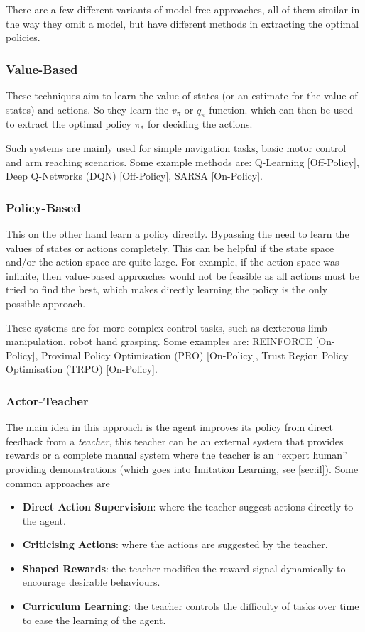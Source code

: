   There are a few different variants of model-free approaches, all of them similar in the way they omit a model, but have different methods in extracting the optimal policies.
  

  \subsubsection{Value-Based}
  These techniques aim to learn the value of states (or an estimate for the value of states) and actions. So they learn the $v_\pi$ or $q_\pi$ function. which can then be used to extract the optimal policy $\pi_*$ for deciding the actions.

  Such systems are mainly used for simple navigation tasks, basic motor control and arm reaching scenarios. Some example methods are: Q-Learning [Off-Policy], Deep Q-Networks (DQN) [Off-Policy], SARSA [On-Policy]. 

  \subsubsection{Policy-Based}
  This on the other hand learn a policy directly. Bypassing the need to learn the values of states or actions completely. This can be helpful if the state space and/or the action space are quite large. For example, if the action space was infinite, then value-based approaches would not be feasible as all actions must be tried to find the best, which makes directly learning the policy is the only possible approach.

  These systems are for more complex control tasks, such as dexterous limb manipulation, robot hand grasping. Some examples are: REINFORCE [On-Policy], Proximal Policy Optimisation (PRO) [On-Policy], Trust Region Policy Optimisation (TRPO) [On-Policy]. 

  \subsubsection{Actor-Teacher} 
  The main idea in this approach is the agent improves its policy from direct feedback from a \emph{teacher}, this teacher can be an external system that provides rewards or a complete manual system where the teacher is an ``expert human'' providing demonstrations (which goes into Imitation Learning, see \ref{sec:il}). Some common approaches are
  \begin{itemize}
    \item \textbf{Direct Action Supervision}: where the teacher suggest actions directly to the agent.
    \item \textbf{Criticising Actions}: where the actions are suggested by the teacher.
    \item \textbf{Shaped Rewards}: the teacher modifies the reward signal dynamically to encourage desirable behaviours.
    \item \textbf{Curriculum Learning}: the teacher controls the difficulty of tasks over time to ease the learning of the agent.
  \end{itemize}
  

